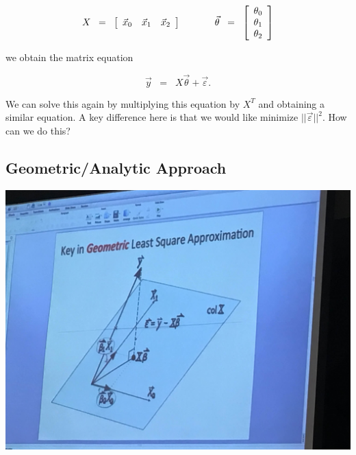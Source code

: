 \documentclass{article}
\begin{document}
\begin{equation*}
X \;\; =\;\; \left [ \begin{array}{ccc}
\vec{x}_0 & \vec{x}_1 & \vec{x}_2 \\
\end{array} \right ] \hspace{3pc} \vec{\theta} \;\; =\;\; \left [ \begin{array}{c}
\theta_0 \\
\theta_1\\
\theta_2 \\
\end{array} \right ]
\end{equation*}

\noindent we obtain the matrix equation

\begin{equation*}
\vec{y} \;\; =\;\; X \vec{\theta} + \vec{\varepsilon}.
\end{equation*}

\noindent We can solve this again by multiplying this equation by $X^T$ and obtaining a similar equation.  A key difference here is that we would like minimize $||\vec{\varepsilon}||^2$.  How can we do this?

\subsection{Geometric/Analytic Approach}

\vspace{1pc}
\centerline{\includegraphics[height=10cm]{GeoKey.JPG}}
\vspace{1pc}
\end{document}

